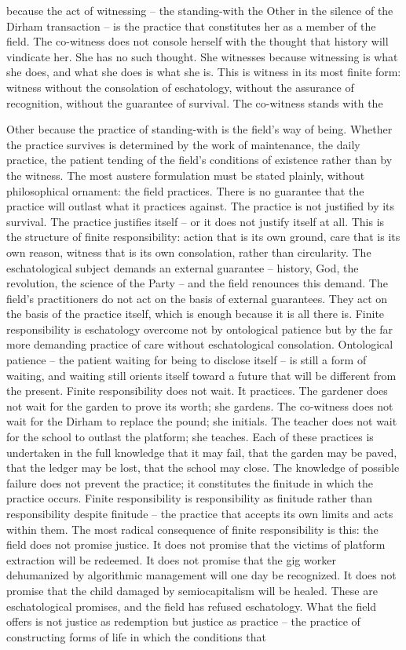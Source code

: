 because the act of witnessing – the standing-with the Other in the silence of the Dirham transaction – is the practice that constitutes her as a member of the field. The co-witness does not console herself with the thought that history will vindicate her. She has no such thought. She witnesses because witnessing is what she does, and what she does is what she is. This is witness in its most finite form: witness without the consolation of eschatology, without the assurance of recognition, without the guarantee of survival. The co-witness stands with the

Other because the practice of standing-with is the field’s way of being. Whether the practice survives is determined by the work of maintenance, the daily practice, the patient tending of the field’s conditions of existence rather than by the witness. The most austere formulation must be stated plainly, without philosophical ornament: the field practices. There is no guarantee that the practice will outlast what it practices against. The practice is not justified by its survival. The practice justifies itself – or it does not justify itself at all. This is the structure of finite responsibility: action that is its own ground, care that is its own reason, witness that is its own consolation, rather than circularity. The eschatological subject demands an external guarantee – history, God, the revolution, the science of the Party – and the field renounces this demand. The field’s practitioners do not act on the basis of external guarantees. They act on the basis of the practice itself, which is enough because it is all there is. Finite responsibility is eschatology overcome not by ontological patience but by the far more demanding practice of care without eschatological consolation. Ontological patience – the patient waiting for being to disclose itself – is still a form of waiting, and waiting still orients itself toward a future that will be different from the present. Finite responsibility does not wait. It practices. The gardener does not wait for the garden to prove its worth; she gardens. The co-witness does not wait for the Dirham to replace the pound; she initials. The teacher does not wait for the school to outlast the platform; she teaches. Each of these practices is undertaken in the full knowledge that it may fail, that the garden may be paved, that the ledger may be lost, that the school may close. The knowledge of possible failure does not prevent the practice; it constitutes the finitude in which the practice occurs. Finite responsibility is responsibility as finitude rather than responsibility despite finitude – the practice that accepts its own limits and acts within them. The most radical consequence of finite responsibility is this: the field does not promise justice. It does not promise that the victims of platform extraction will be redeemed. It does not promise that the gig worker dehumanized by algorithmic management will one day be recognized. It does not promise that the child damaged by semiocapitalism will be healed. These are eschatological promises, and the field has refused eschatology. What the field offers is not justice as redemption but justice as practice – the practice of constructing forms of life in which the conditions that 